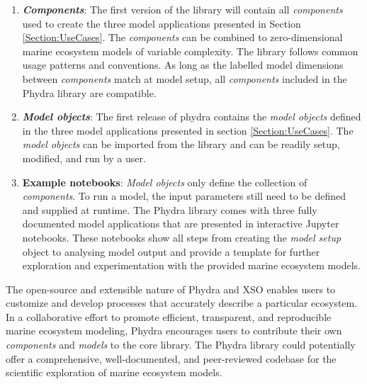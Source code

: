 \documentclass[journal abbreviation, manuscript]{copernicus}
\begin{document}
\begin{enumerate}
    \item \textbf{\textit{Components}}: The first version of the library will contain all \textit{components} used to create the three model applications presented in Section \ref{Section:UseCases}. The \textit{components} can be combined to zero-dimensional marine ecosystem models of variable complexity. The library follows common usage patterns and conventions. As long as the labelled model dimensions between \textit{components} match at model setup, all \textit{components} included in the Phydra library are compatible.
    
    \item \textbf{\textit{Model objects}}: The first release of phydra contains the \textit{model objects} defined in the three model applications presented in section \ref{Section:UseCases}. The \textit{model objects} can be imported from the library and can be readily setup, modified, and run by a user.
    
    \item \textbf{Example notebooks}: \textit{Model objects} only define the collection of \textit{components}. To run a model, the input parameters still need to be defined and supplied at runtime. The Phydra library comes with three fully documented model applications that are presented in interactive Jupyter notebooks. These notebooks show all steps from creating the \textit{model setup} object to analysing model output and provide a template for further exploration and experimentation with the provided marine ecosystem models.
    
\end{enumerate}

The open-source and extensible nature of Phydra and XSO enables users to customize and develop processes that accurately describe a particular ecosystem. In a collaborative effort to promote efficient, transparent, and reproducible marine ecosystem modeling, Phydra encourages users to contribute their own \textit{components} and \textit{models} to the core library. The Phydra library could potentially offer a comprehensive, well-documented, and peer-reviewed codebase for the scientific exploration of marine ecosystem models.
\end{document}
